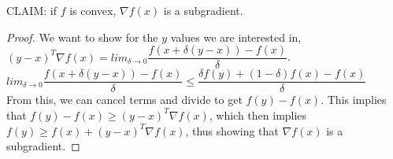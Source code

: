 \documentclass[11pt]{article}
\begin{document}
CLAIM: if $f$ is convex, $\nabla f(x)$ is a subgradient.

\begin{proof}
We want to show for the $y$ values we are interested in, $(y-x)^{T} \nabla f(x) = lim_{\delta \longrightarrow 0} \dfrac{f(x + \delta (y-x))-f(x)}{\delta}$.\\
$lim_{\delta \longrightarrow 0} \dfrac{f(x + \delta (y-x))-f(x)}{\delta} \leq  \dfrac{\delta f(y) + (1-\delta)f(x) -f(x)}{\delta}$\\
From this, we can cancel terms and divide to get $f(y) - f(x)$.  This implies that  $f(y) - f(x) \geq (y-x)^{T} \nabla f(x)$, which then implies $f(y) \geq f(x) + (y-x)^{T} \nabla f(x)$, thus showing that $\nabla f(x)$ is a subgradient.
\end{proof}

\end{document}
